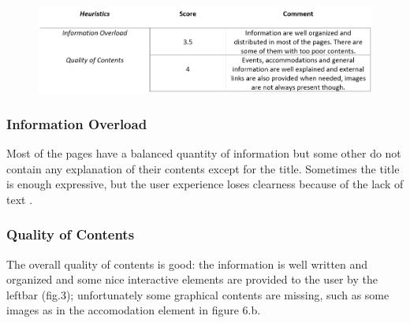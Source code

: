 \begin{figure}[h!]
	\centering
	\begin{minipage}[b]{1\textwidth}
    		\includegraphics[width=\textwidth]{./assets/contents-final.PNG}
	\end{minipage}
\end{figure}
\FloatBarrier

\subsubsection{Information Overload}
Most of the pages have a balanced quantity of information but some other do not contain any explanation of their contents except for the title. Sometimes the title is enough expressive, but the user experience loses clearness because of the lack of text .
\FloatBarrier

\subsubsection{Quality of Contents}
The overall quality of contents is good: the information is well written and organized  and some nice interactive elements are provided to the user by the leftbar (fig.3); unfortunately some graphical contents are missing, such as some images as in the accomodation element in figure 6.b.
\begin{figure}[h!]
		\hfill
		\hfill
	\caption{}
\end{figure}



